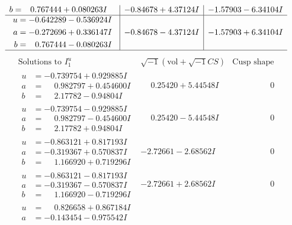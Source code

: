 \documentclass[1p]{elsarticle_modified}
\theoremstyle{definition}
\newcommand{\I}{\sqrt{-1}}
\begin{document}
$$\begin{array}{c|c|c}
\begin{aligned}
b &= \phantom{-}0.767444 + 0.080263 I\end{aligned}
 & -0.84678 + 4.37124 I & -1.57903 - 6.34104 I \\ \hline\begin{aligned}
u &= -0.642289 - 0.536924 I \\
a &= -0.272696 + 0.336147 I \\
b &= \phantom{-}0.767444 - 0.080263 I\end{aligned}
 & -0.84678 - 4.37124 I & -1.57903 + 6.34104 I\\
 \hline 
 \end{array}$$\newpage$$\begin{array}{c|c|c}  
\text{Solutions to }I^u_{1}& \I (\text{vol} + \sqrt{-1}CS) & \text{Cusp shape}\\
 \hline 
\begin{aligned}
u &= -0.739754 + 0.929885 I \\
a &= \phantom{-}0.982797 + 0.454600 I \\
b &= \phantom{-}2.17782 - 0.94804 I\end{aligned}
 & \phantom{-}0.25420 + 5.44548 I & \phantom{-0.000000 } 0 \\ \hline\begin{aligned}
u &= -0.739754 - 0.929885 I \\
a &= \phantom{-}0.982797 - 0.454600 I \\
b &= \phantom{-}2.17782 + 0.94804 I\end{aligned}
 & \phantom{-}0.25420 - 5.44548 I & \phantom{-0.000000 } 0 \\ \hline\begin{aligned}
u &= -0.863121 + 0.817193 I \\
a &= -0.319367 + 0.570837 I \\
b &= \phantom{-}1.166920 + 0.719296 I\end{aligned}
 & -2.72661 - 2.68562 I & \phantom{-0.000000 } 0 \\ \hline\begin{aligned}
u &= -0.863121 - 0.817193 I \\
a &= -0.319367 - 0.570837 I \\
b &= \phantom{-}1.166920 - 0.719296 I\end{aligned}
 & -2.72661 + 2.68562 I & \phantom{-0.000000 } 0 \\ \hline\begin{aligned}
u &= \phantom{-}0.826658 + 0.867184 I \\
a &= -0.143454 - 0.975542 I \\

\end{aligned}
\end{array}$$
\end{document}
